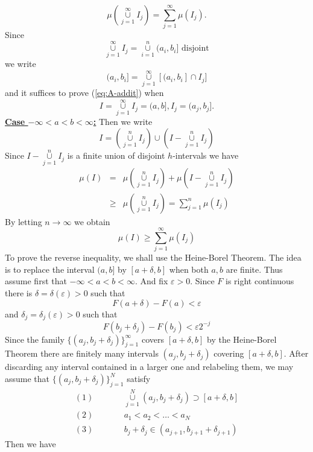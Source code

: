\documentclass[12pt]{report}
\begin{document}
\begin{equation}\label{eq:A-addit}
 \mu \left ( \overset{\infty}{\underset{j=1}{\cup}}  I_j\right ) =
\sum^\infty_{j=1}
\mu(I_j).
\end{equation} 
Since
\[\overset{\infty}{\underset{j=1}{\cup}}I_j  =
\overset{n}{\underset{i=1}{\cup}}  (a_i, b_i] \mbox{ disjoint}
\] we write
\[(a_i, b_i] = \overset{\infty}{\underset{j=1}{\cup}}  [(a_i, b_i] \cap I_j]
\] and it suffices to prove (\ref{eq:A-addit}) when
\[ I = \overset{\infty}{\underset{j=1}{\cup}} I_j = (a, b], I_j = (a_j, b_j].
\]
\underline{{\bf  Case $-\infty < a < b < \infty$:}}   Then we write
\[ I = \left ( \overset{n}{\underset{j=1}{\cup}} I_j \right ) \cup \left ( I -
\overset{n}{\underset{j=1}{\cup}}  I_j \right )\] Since $I -
\overset{n}{\underset{j=1}{\cup}}  I_j$ is a finite union of disjoint
$h$-intervals we have
\begin{eqnarray*}
\mu(I) &=& \mu\left ( \overset{n}{\underset{j=1}{\cup}}  I_j \right ) + \mu
\left ( I -
\overset{n}{\underset{j=1}{\cup}}  I_j\right )\\ &\ge& \mu \left (
\overset{n}{\underset{j=1}{\cup}}  I_j \right ) = \sum^n_{j=1}
\mu(I_j)
\end{eqnarray*} By letting $n \to \infty$ we obtain
\begin{equation}\label{eq:A-addit.1}
\mu(I) \ge \sum^\infty_{j=1} \mu(I_j) 
\end{equation} 
To prove the reverse inequality, we shall use the
Heine-Borel Theorem.  The idea is to replace the interval $(a, b]$ by $[a +
\delta, b]$ when both $a, b$ are finite. Thus assume first that $- \infty < a <
b < \infty$.  And fix $\varepsilon > 0$.  Since
$F$ is right continuous there is $\delta = \delta (\varepsilon) > 0$ such that
\[ F(a + \delta) - F(a) < \varepsilon
\] and $\delta_j = \delta_j (\varepsilon) > 0 $ such that
\[ F(b_j + \delta_j) - F(b_j) < \varepsilon 2^{-j}
\]
\noindent 
Since the family $\{(a_j, b_j + \delta_j) \}^\infty_{j=1}$ covers
$[a +
\delta, b]$ by the Heine-Borel Theorem there are finitely many intervals
$(a_j, b_j +
\delta_j)$ covering $[a + \delta, b]$.  After discarding any interval
contained in a larger one and relabeling them, we may assume that $\{(a_j,
b_j+\delta_j)\}^N_{j=1}$ 
satisfy
\begin{eqnarray*} (1) &\qquad&\overset{N}{\underset{j=1}{\cup}}  (a_j,
b_j + \delta_j) \supset [a +
\delta, b]\\ (2) &\qquad& a_1 < a_2 < \dots < a_N\\ (3) &\qquad& b_j +
\delta_j \in (a_{j+1}, b_{j+1} + \delta_{j+1})
\end{eqnarray*} Then we have
\end{document}
